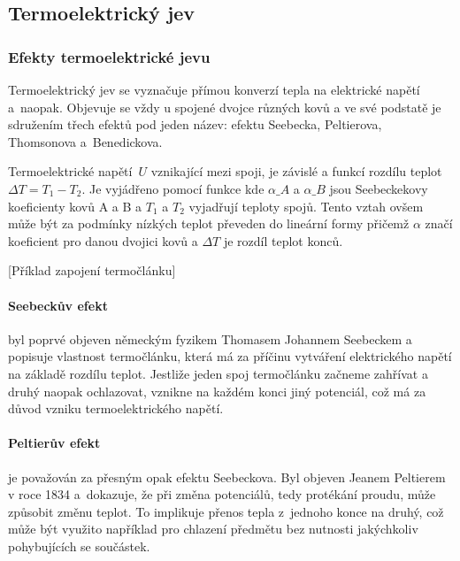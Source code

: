 \subsection{Termoelektrický jev}
\subsubsection{Efekty termoelektrické jevu}
Termoelektrický jev se vyznačuje přímou konverzí tepla na elektrické napětí
a~naopak. Objevuje se vždy u spojené dvojce různých kovů a ve své podstatě je
sdružením třech efektů pod jeden název: efektu Seebecka, Peltierova, Thomsonova
a~Benedickova.~\cite{praktikum,diplomka}

Termoelektrické napětí~$U$ vznikající mezi spoji, je závislé a funkcí rozdílu
teplot~$\Delta T = T_1 - T_2$. Je vyjádřeno pomocí funkce
kde $\alpha\_A$ a $\alpha\_B$ jsou Seebeckekovy koeficienty kovů A a B a $T_1$
a $T_2$ vyjadřují teploty spojů.  Tento vztah ovšem může být za podmínky
nízkých teplot převeden do lineární formy
přičemž $\alpha$ značí koeficient pro danou dvojici kovů a $\Delta T$ je rozdíl
teplot konců.~\cite{diplomka}

[Příklad zapojení
termočlánku]

\paragraph{Seebeckův efekt} byl poprvé objeven německým fyzikem Thomasem
Johannem Seebeckem a popisuje vlastnost termočlánku, která má za příčinu
vytváření elektrického napětí na základě rozdílu teplot. Jestliže jeden spoj
termočlánku začneme zahřívat a druhý naopak ochlazovat, vznikne na každém konci
jiný potenciál, což má za důvod vzniku termoelektrického
napětí.~\cite{jreichl-seebeck}

\paragraph{Peltierův efekt} je považován za přesným opak efektu Seebeckova. Byl
objeven Jeanem Peltierem v roce 1834 a~dokazuje, že při změna potenciálů, tedy
protékání proudu, může způsobit změnu teplot. To implikuje přenos tepla
z~jednoho konce na druhý, což může být využito například pro chlazení předmětu
bez nutnosti jakýchkoliv pohybujících se součástek.~\cite{peltier}

